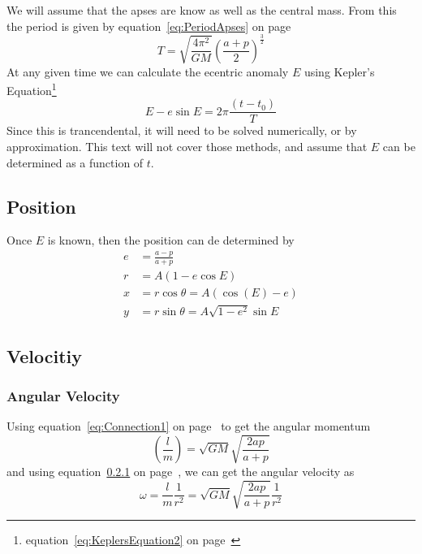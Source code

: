 We will assume that the apses are know as well as the central mass. From this the period is given by equation~\ref{eq:PeriodApses} on page~\pageref{eq:PeriodApses}
\begin{equation*}
T =\sqrt{ \frac{4 \pi^2 }{GM}}\left(\frac{a+p}{2}\right)^\frac{3}{2}
\end{equation*}
At any given time we can calculate the ecentric anomaly $E$ using Kepler's Equation\footnote{equation~\ref{eq:KeplersEquation2} on page~\pageref{eq:KeplersEquation2}}
\begin{equation*}
E-e\sin E = 2\pi\frac{(t-t_0)}{T}
\end{equation*}
Since this is trancendental, it will need to be solved numerically, or by approximation. This text will not cover those methods, and assume that $E$ can be determined as a function of $t$.

\subsection{Position}
Once $E$ is known, then the position can de determined by
\begin{align*}
e&=\frac{a-p}{a+p}\\
r&=A\left( 1-e\cos E\right)\\
x&=r\cos\theta =A(\cos(E)-e)\\
y&=r\sin\theta = A\sqrt{1-e^2}\sin E
\end{align*}

\subsection{Velocitiy}

\subsubsection{Angular Velocity}

Using equation~\ref{eq:Connection1} on page~\pageref{eq:Connection1} to get the angular momentum
\begin{equation*}
\left(\frac{l}{m} \right) =\sqrt{GM}\sqrt{\frac{2ap}{a+p}}
\end{equation*}
and using equation~\ref{} on page~\pageref{}, we can get the angular velocity as
\begin{equation}
\omega = \frac{l}{m}\frac{1}{r^2}=\sqrt{GM}\sqrt{\frac{2ap}{a+p}}\frac{1}{r^2}
\end{equation}

